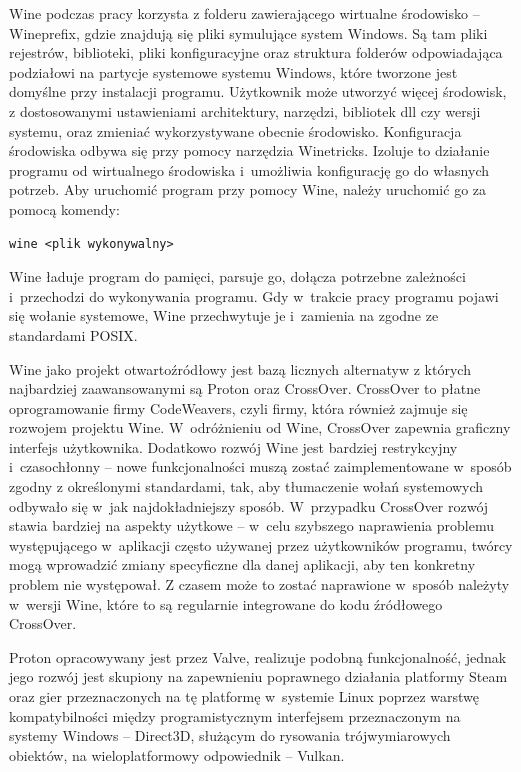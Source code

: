 Wine podczas pracy korzysta z folderu zawierającego wirtualne środowisko -- Wineprefix\cite{wineprefix}, gdzie znajdują się pliki symulujące system Windows. Są tam pliki rejestrów, biblioteki, pliki konfiguracyjne oraz struktura folderów odpowiadająca podziałowi na partycje systemowe systemu Windows, które tworzone jest domyślne przy instalacji programu. Użytkownik może utworzyć więcej środowisk, z dostosowanymi ustawieniami architektury, narzędzi, bibliotek dll czy wersji systemu, oraz zmieniać wykorzystywane obecnie środowisko. Konfiguracja środowiska odbywa się przy pomocy narzędzia Winetricks\cite{winetricks}. Izoluje to działanie programu od wirtualnego środowiska i~umożliwia konfigurację go do własnych potrzeb. Aby uruchomić program przy pomocy Wine, należy uruchomić go za pomocą komendy:
\begin{verbatim}
wine <plik wykonywalny>
\end{verbatim} Wine ładuje program do pamięci, parsuje go, dołącza potrzebne zależności i~przechodzi do wykonywania programu. Gdy w~trakcie pracy programu pojawi się wołanie systemowe, Wine przechwytuje je i~zamienia na zgodne ze standardami POSIX. 

Wine jako projekt otwartoźródłowy jest bazą licznych alternatyw\cite{wineBasedProjects} z których najbardziej zaawansowanymi są Proton\cite{proton} oraz CrossOver\cite{crossover}. CrossOver to płatne oprogramowanie firmy CodeWeavers, czyli firmy, która również zajmuje się rozwojem projektu Wine. W~odróżnieniu od Wine, CrossOver zapewnia graficzny interfejs użytkownika. Dodatkowo rozwój Wine jest bardziej restrykcyjny i~czasochłonny -- nowe funkcjonalności muszą zostać zaimplementowane w~sposób zgodny z określonymi standardami, tak, aby tłumaczenie wołań systemowych odbywało się w~jak najdokładniejszy sposób. W~przypadku CrossOver rozwój stawia bardziej na aspekty użytkowe -- w~celu szybszego naprawienia problemu występującego w~aplikacji często używanej przez użytkowników programu, twórcy mogą wprowadzić zmiany specyficzne dla danej aplikacji, aby ten konkretny problem nie występował. Z czasem może to zostać naprawione w~sposób należyty w~wersji Wine, które to są regularnie integrowane do kodu źródłowego CrossOver.

Proton opracowywany jest przez Valve, realizuje podobną funkcjonalność, jednak jego rozwój jest skupiony na zapewnieniu poprawnego działania platformy Steam oraz gier przeznaczonych na tę platformę w~systemie Linux poprzez warstwę kompatybilności między programistycznym interfejsem przeznaczonym na systemy Windows -- Direct3D, służącym do rysowania trójwymiarowych obiektów, na wieloplatformowy odpowiednik -- Vulkan.

